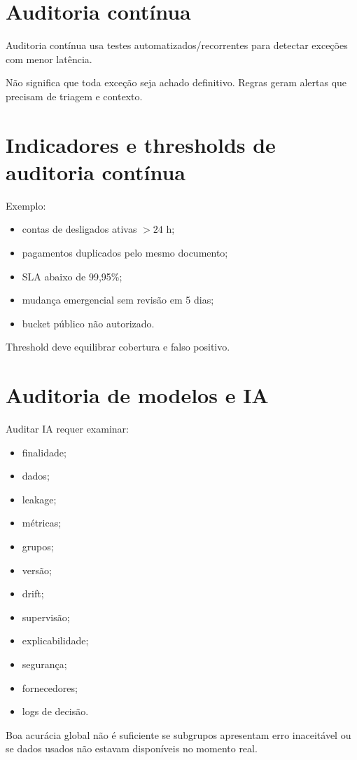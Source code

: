\section{Auditoria contínua}

Auditoria contínua usa testes automatizados/recorrentes para detectar exceções com menor latência.

Não significa que toda exceção seja achado definitivo. Regras geram alertas que precisam de triagem e contexto.

\section{Indicadores e thresholds de auditoria contínua}

Exemplo:
\begin{itemize}
\item contas de desligados ativas $>24$ h;
\item pagamentos duplicados pelo mesmo documento;
\item SLA abaixo de 99,95\%;
\item mudança emergencial sem revisão em 5 dias;
\item bucket público não autorizado.
\end{itemize}

Threshold deve equilibrar cobertura e falso positivo.

\section{Auditoria de modelos e IA}

Auditar IA requer examinar:
\begin{itemize}
\item finalidade;
\item dados;
\item leakage;
\item métricas;
\item grupos;
\item versão;
\item drift;
\item supervisão;
\item explicabilidade;
\item segurança;
\item fornecedores;
\item logs de decisão.
\end{itemize}

Boa acurácia global não é suficiente se subgrupos apresentam erro inaceitável ou se dados usados não estavam disponíveis no momento real.

